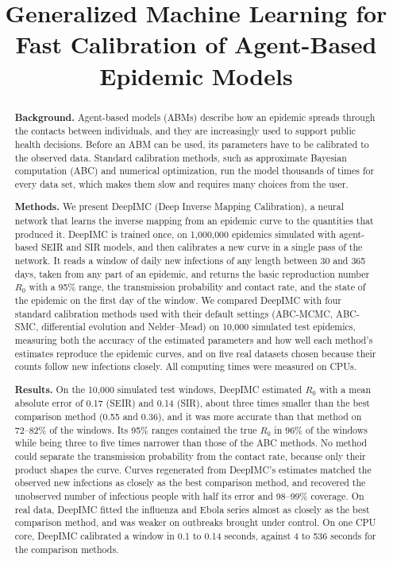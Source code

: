\documentclass[12pt]{article}
\title{Generalized Machine Learning for Fast Calibration of Agent-Based Epidemic Models}
\date{}
\begin{document}
\maketitle

\begin{abstract}
\noindent\textbf{Background.}
Agent-based models (ABMs) describe how an epidemic spreads through the contacts between
individuals, and they are increasingly used to support public health decisions. Before an ABM can
be used, its parameters have to be calibrated to the observed data. Standard calibration methods,
such as approximate Bayesian computation (ABC) and numerical optimization, run the model thousands
of times for every data set, which makes them slow and requires many choices from the user.

\noindent\textbf{Methods.}
We present DeepIMC (Deep Inverse Mapping Calibration), a neural network that learns the inverse
mapping from an epidemic curve to the quantities that produced it. DeepIMC is trained once, on
1,000,000 epidemics simulated with agent-based SEIR and SIR models, and then calibrates a new
curve in a single pass of the network. It reads a window of daily new infections of any length
between 30 and 365 days, taken from any part of an epidemic, and returns the basic reproduction
number $R_0$ with a 95\% range, the transmission probability and contact rate, and the state of
the epidemic on the first day of the window. We compared DeepIMC with four standard calibration
methods used with their default settings (ABC-MCMC, ABC-SMC, differential evolution and
Nelder--Mead) on 10,000 simulated test epidemics, measuring both the accuracy of the estimated
parameters and how well each method's estimates reproduce the epidemic curves, and on five real
datasets chosen because their counts follow new infections closely. All computing times were
measured on CPUs.

\noindent\textbf{Results.}
On the 10,000 simulated test windows, DeepIMC estimated $R_0$ with a mean absolute error of 0.17 (SEIR)
and 0.14 (SIR), about three times smaller than the best comparison method (0.55 and 0.36), and it was
more accurate than that method on 72--82\% of the windows. Its 95\% ranges contained the true $R_0$ in
96\% of the windows while being three to five times narrower than those of the ABC methods. No method
could separate the transmission probability from the contact rate, because only their product shapes
the curve. Curves regenerated from DeepIMC's estimates matched the observed new infections as closely
as the best comparison method, and recovered the unobserved number of infectious people with half its
error and 98--99\% coverage. On real data, DeepIMC fitted the influenza and Ebola series almost as
closely as the best comparison method, and was weaker on outbreaks brought under control. On one CPU
core, DeepIMC calibrated a window in 0.1 to 0.14 seconds, against 4 to 536 seconds for the comparison
methods.


\end{abstract}
\end{document}

